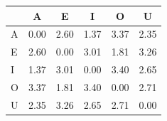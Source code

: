 \begin{tabular}{lccccc}
\toprule
\rowcolor{col01}
 & A & E & I & O & U \\
\midrule
A & 0.00 & 2.60 & 1.37 & 3.37 & 2.35 \\
E & 2.60 & 0.00 & 3.01 & 1.81 & 3.26 \\
I & 1.37 & 3.01 & 0.00 & 3.40 & 2.65 \\
O & 3.37 & 1.81 & 3.40 & 0.00 & 2.71 \\
U & 2.35 & 3.26 & 2.65 & 2.71 & 0.00 \\
\bottomrule
\end{tabular}
